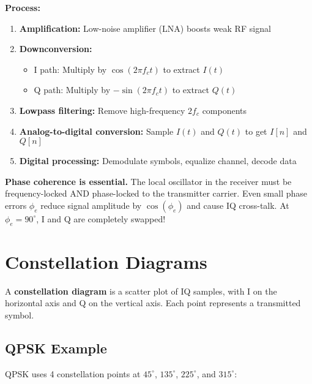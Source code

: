 \textbf{Process:}
\begin{enumerate}
\item \textbf{Amplification:} Low-noise amplifier (LNA) boosts weak RF signal
\item \textbf{Downconversion:}
  \begin{itemize}
  \item I path: Multiply by $\cos(2\pi f_c t)$ to extract $I(t)$
  \item Q path: Multiply by $-\sin(2\pi f_c t)$ to extract $Q(t)$
  \end{itemize}
\item \textbf{Lowpass filtering:} Remove high-frequency $2f_c$ components
\item \textbf{Analog-to-digital conversion:} Sample $I(t)$ and $Q(t)$ to get $I[n]$ and $Q[n]$
\item \textbf{Digital processing:} Demodulate symbols, equalize channel, decode data
\end{enumerate}

\begin{warningbox}
\textbf{Phase coherence is essential.} The local oscillator in the receiver must be frequency-locked AND phase-locked to the transmitter carrier. Even small phase errors $\phi_e$ reduce signal amplitude by $\cos(\phi_e)$ and cause IQ cross-talk. At $\phi_e = 90^\circ$, I and Q are completely swapped!
\end{warningbox}

\section{Constellation Diagrams}

A \textbf{constellation diagram} is a scatter plot of IQ samples, with I on the horizontal axis and Q on the vertical axis. Each point represents a transmitted symbol.

\subsection{QPSK Example}

QPSK uses 4 constellation points at $45^\circ$, $135^\circ$, $225^\circ$, and $315^\circ$:

